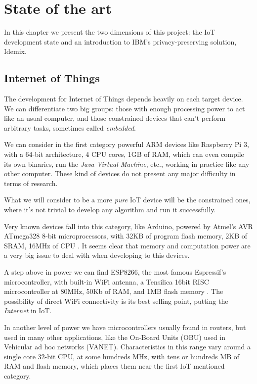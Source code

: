 \chapter{State of the art}\label{ch:stateoftheart}

In this chapter we present the two dimensions of this project: the \ac{IoT} development state and an introduction to IBM's privacy-preserving solution, Idemix.

\section{Internet of Things}

The development for Internet of Things depends heavily on each target device. We can differentiate two big groups: those with enough processing power to act like an usual computer, and those constrained devices that can't perform arbitrary tasks, sometimes called \textit{embedded}.


We can consider in the first category powerful ARM devices like Raspberry Pi 3, with a 64-bit architecture, 4 CPU cores, 1GB of RAM, which can even compile its own binaries, run the \textit{Java Virtual Machine}, etc., working in practice like any other computer. These kind of devices do not present any major difficulty in terms of research.

What we will consider to be a more \textit{pure} \ac{IoT} device will be the constrained ones, where it's not trivial to develop any algorithm and run it successfully.

Very known devices fall into this category, like Arduino, powered by Atmel's AVR ATmega328 8-bit microprocessors, with 32KB of program flash memory, 2KB of SRAM, 16MHz of CPU \citep{ATmega328}. It seems clear that memory and computation power are a very big issue to deal with when developing to this devices.

A step above in power we can find ESP8266, the most famous Espressif's microcontroller, with built-in WiFi antenna, a Tensilica 16bit RISC microcontroller at 80MHz, 50Kb of RAM, and 1MB flash memory \citep{ESP8266}. The possibility of direct WiFi connectivity is its best selling point, putting the \textit{Internet} in \acl{IoT}.

In another level of power we have microcontrollers usually found in routers, but used in many other applications, like the On-Board Units (OBU) used in Vehicular ad hoc networks (VANET). Characteristics in this range vary around a single core 32-bit CPU, at some hundreds MHz, with tens or hundreds MB of RAM and flash memory, which places them near the first \ac{IoT} mentioned category. 

